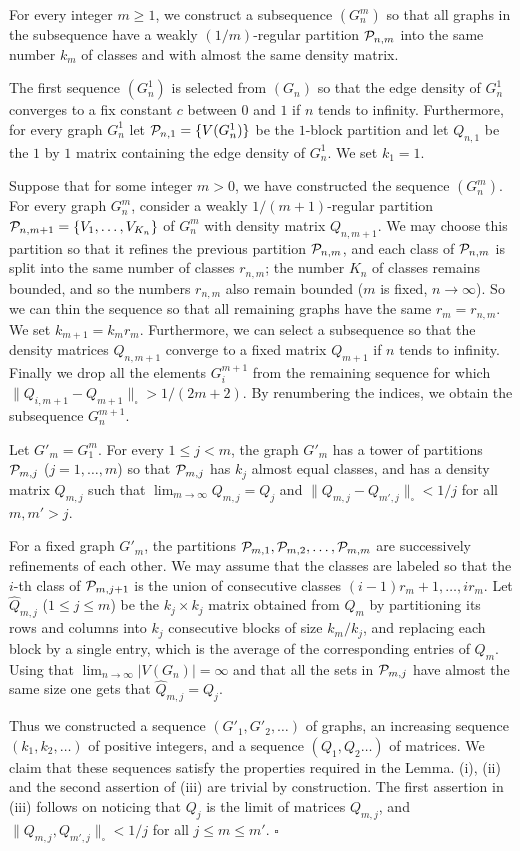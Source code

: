 \documentclass[fleqn]{article}
\newenvironment{proof}{\noindent{\bf Proof. }}{\hfill$\square$\medskip}
\begin{document}
\begin{proof}
For every integer $m\ge 1$, we construct a subsequence
$(G_n^m)$ so that all graphs in the subsequence have a weakly
$(1/m)$-regular partition ${\cal P}_{n,m}$ into the same number $k_m$ of
classes and with almost the same density matrix.

The first sequence $(G_n^1)$ is selected from $(G_n)$ so that the
edge density of $G_n^1$ converges to a fix constant $c$ between $0$
and $1$ if $n$ tends to infinity. Furthermore, for every graph
$G_n^1$ let ${\cal P}_{n,1}=\{V(G_n^1)\}$ be the $1$-block partition and
let $Q_{n,1}$ be the $1$ by $1$ matrix containing the edge density of
$G_n^1$. We set $k_1=1$.

Suppose that for some integer $m>0$, we have constructed the sequence
$(G_n^m)$. For every graph $G_n^m$, consider a weakly
$1/(m+1)$-regular partition ${\cal P}_{n,m+1}=\{V_1,\dots, V_{K_n}\}$ of
$G^m_n$ with density matrix $Q_{n,{m+1}}$. We may choose this
partition so that it refines the previous partition ${\cal P}_{n,m}$, and
each class of ${\cal P}_{n,m}$ is split into the same number of classes
$r_{n,m}$; the number $K_n$ of classes remains bounded, and so the
numbers $r_{n,m}$ also remain bounded ($m$ is fixed, $n\to\infty$).
So we can thin the sequence so that all remaining graphs have the
same $r_{m}=r_{n,m}$. We set $k_{m+1}=k_mr_m$. Furthermore, we can
select a subsequence so that the density matrices $Q_{n,m+1}$
converge to a fixed matrix $Q_{m+1}$ if $n$ tends to infinity.
Finally we drop all the elements $G_i^{m+1}$ from the remaining
sequence for which $\|Q_{i,m+1}-Q_{m+1}\|_\square >1/(2m+2)$. By
renumbering the indices, we obtain the subsequence $G_n^{m+1}$.

Let $G'_m=G_1^m$. For every $1\le j<m$, the graph $G'_m$ has a tower
of partitions ${\cal P}_{m,j}$ ($j=1,\dots,m$) so that ${\cal P}_{m,j}$ has
$k_j$ almost equal classes, and has a density matrix $Q_{m,j}$ such
that $\lim_{m\to\infty}Q_{m,j}=Q_j$ and $\|Q_{m,j}-Q_{m',j}\|_\square
<1/j$ for all $m,m'>j$.

For a fixed graph $G'_m$, the partitions
${\cal P}_{m,1},{\cal P}_{m,2},\dots,{\cal P}_{m,m}$ are successively refinements
of each other. We may assume that the classes are labeled so that
the $i$-th class of ${\cal P}_{m,j+1}$ is the union of consecutive
classes $(i-1)r_m+1,\dots,ir_m$. Let $\widehat{Q}_{m,j}$ ($1\le
j\le m$) be the $k_j\times k_j$ matrix obtained from $Q_m$ by
partitioning its rows and columns into $k_j$ consecutive blocks of
size $k_m/k_j$, and replacing each block by a single entry, which
is the average of the corresponding entries of $Q_m$. Using that
$\lim_{n\to\infty} |V(G_n)|=\infty$ and that all the sets in
${\cal P}_{m,j}$ have almost the same size one gets that
$\widehat{Q}_{m,j}=Q_j$.

Thus we constructed a sequence $(G'_1,G'_2,\dots)$ of graphs, an
increasing sequence $(k_1,k_2,\dots)$ of positive integers, and a
sequence $(Q_1,Q_2\dots)$ of matrices. We claim that these sequences
satisfy the properties required in the Lemma. (i), (ii) and the
second assertion of (iii) are trivial by construction. The first
assertion in (iii) follows on noticing that $Q_j$ is the limit of
matrices $Q_{m,j}$, and $\|Q_{m,j},Q_{m',j}\|_\square<1/j$ for all
$j\leq m \leq m'$.
\end{proof}
\end{document}
